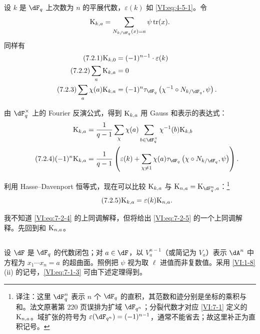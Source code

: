 \subsection{}\label{VI:7-2}

设 $k$ 是 $\dF_q$ 上次数为 $n$ 的平展代数，$\varepsilon(k)$ 如 \eqref{VI:eq:4-5-1}。令
\[
  \kloos_{k,a} = \sum_{N_{k/\dF_q}(x)=a} \psi \tr(x) \text{.}
\]
同样有
\begin{align*}\tag{7.2.1}\label{VI:eq:7-2-1}
  \kloos_{k,0} &= (-1)^{n-1} \cdot \varepsilon(k) \\ \tag{7.2.2}\label{VI:eq:7-2-2}
  \sum_a \kloos_{k,a} &= 0 \\ \tag{7.2.3}\label{VI:eq:7-2-3}
  \sum_a \chi(a) \kloos_{k,a} &= (-1)^n \tau_{\dF_q}\left(\chi^{-1}\circ N_{k/\dF_q},\psi\right) \text{.}
\end{align*}

由 $\dF_q^\times$ 上的 Fourier 反演公式，得到 $\textnormal{K}_{k,a}$ 用 Gauss 和表示的表达式：
\begin{align*}
  \kloos_{k,a} &= \frac{1}{q-1} \sum_\chi \chi(a) \sum_{b\in \dF_q^\times} \chi^{-1}(b) \kloos_{k,b} \\ \tag{7.2.4}\label{VI:eq:7-2-4}
  (-1)^n \kloos_{k,a} &= \frac{1}{q-1} \left(\varepsilon(k) + \sum_{\chi\ne 1} \chi(a) \tau_{\dF_q}\left(\chi\circ N_{k/\dF_q},\psi\right) \right) \text{.}
\end{align*}

利用 Hasse--Davenport 恒等式，现在可以比较 $\textnormal{K}_{k,a}$ 与 $\kloos_{n,a} = \kloos_{\dF_q^n,a}$：\footnote{译注：这里 $\dF_q^n$ 表示 $n$ 个 $\dF_q$ 的直积，其范数和迹分别是坐标的乘积与和。法文原著第 220 页误排为扩域 $\dF_{q^n}$；分裂代数才对应 \ref{VI:7-1} 定义的 $\textnormal{K}_{n,a}$。域扩张的符号为 $\varepsilon(\dF_{q^n})=(-1)^{n-1}$，通常不能省去；故这里补正为直积记号。}
\begin{equation*}\tag{7.2.5}\label{VI:eq:7-2-5}
  \textnormal{K}_{k,a} = \varepsilon(k) \textnormal{K}_{n,a} \text{.}
\end{equation*}

我不知道 \eqref{VI:eq:7-2-4} 的上同调解释，但将给出 \eqref{VI:eq:7-2-5} 的一个上同调解释。先回到和 $\textnormal{K}_{n,a}$。

\subsection{}\label{VI:7-3}

设 $\dF$ 是 $\dF_q$ 的代数闭包；对 $a\in \dF$，以 $V_a^{n-1}$（或简记为 $V_a$）表示 $\dA^n$ 中方程为 $x_1 \dotsm x_n=a$ 的超曲面。照例把 $\psi$ 视为取 $\ell$ 进值而非复数值。采用 \ref{VI:1-8}(ii) 的记号，\eqref{VI:eq:7-1-3} 可由下述定理得到。

